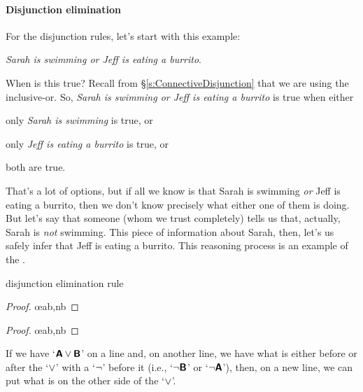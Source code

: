 \paragraph{Disjunction elimination}
For the disjunction rules, let's start with this example: 
\begin{ebullet}
	\item[] \textit{Sarah is swimming or Jeff is eating a burrito}. 
\end{ebullet}
When is this true? Recall from \S \ref{s:ConnectiveDisjunction} that we are using the inclusive-or. So, \textit{Sarah is swimming or Jeff is eating a burrito} is true when either
\begin{ebullet}
	\item[(a)] only \textit{Sarah is swimming} is true, or 
	\item[(b)] only \textit{Jeff is eating a burrito} is true, or 
	\item[(c)] both are true. 
\end{ebullet}
That's a lot of options, but if all we know is that Sarah is swimming \textit{or} Jeff is eating a burrito, then we don't know precisely what either one of them is doing. But let's say that someone (whom we trust completely) tells us that, actually, Sarah is \textit{not} swimming. This piece of information about Sarah, then, let's us safely infer that Jeff is eating a burrito. This reasoning process is an example of the .

\medskip
\begin{factboxy}{disjunction elimination rule}
\begin{proof}
	 \oe{ab,nb}
\end{proof}

\begin{proof}
	 \oe{ab,nb}
\end{proof}

\small{If we have `$\bm{\mathsf{A}}\vee\bm{\mathsf{B}}$' on a line and, on another line, we have what is either before or after the `$\vee$' with a `${\neg}$' before it (i.e., `${\neg}\bm{\mathsf{B}}$' or `${\neg}\bm{\mathsf{A}}$'), then, on a new line, we can put what is on the other side of the `$\vee$'.}

\end{factboxy}					%


